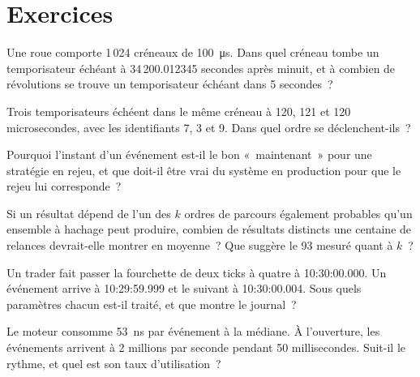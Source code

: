 \section{Exercices}

\begin{exercise}[$\star$]\label{exo:ll:the-strategy-engine:1}
Une roue comporte 1\,024 créneaux de \qty{100}{\micro\second}. Dans quel créneau tombe un temporisateur échéant à 34\,200.012345 secondes après minuit,
et à combien de révolutions se trouve un temporisateur échéant dans 5 secondes~?
\end{exercise}

\begin{exercise}[$\star$]\label{exo:ll:the-strategy-engine:2}
Trois temporisateurs échéent dans le même créneau à 120, 121 et 120 microsecondes, avec les identifiants 7, 3 et 9. Dans quel ordre se déclenchent-ils~?
\end{exercise}

\begin{exercise}[$\star$]\label{exo:ll:the-strategy-engine:3}
Pourquoi l'instant d'un événement est-il le bon «~maintenant~» pour une stratégie en rejeu, et que doit-il être vrai du système
en production pour que le rejeu lui corresponde~?
\end{exercise}

\begin{exercise}[$\star\star$]\label{exo:ll:the-strategy-engine:4}
Si un résultat dépend de l'un des $k$ ordres de parcours également probables qu'un ensemble à hachage peut produire,
combien de résultats distincts une centaine de relances devrait-elle montrer en moyenne~? Que suggère le 93 mesuré quant à $k$~?
\end{exercise}

\begin{exercise}[$\star\star$]\label{exo:ll:the-strategy-engine:5}
Un trader fait passer la fourchette de deux ticks à quatre à 10:30:00.000. Un événement arrive à 10:29:59.999 et le suivant à
10:30:00.004. Sous quels paramètres chacun est-il traité, et que montre le journal~?
\end{exercise}

\begin{exercise}[$\star\star$]\label{exo:ll:the-strategy-engine:6}
Le moteur consomme \qty{53}{\nano\second} par événement à la médiane. À l'ouverture, les événements arrivent à 2 millions par seconde pendant 50
millisecondes. Suit-il le rythme, et quel est son taux d'utilisation~?
\end{exercise}

